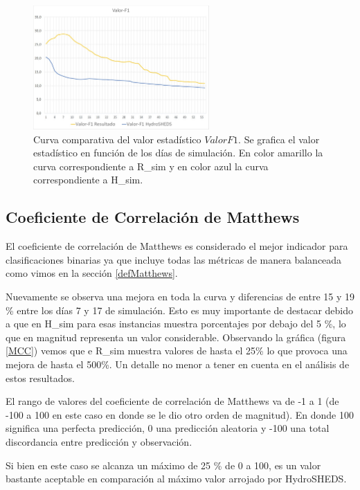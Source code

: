 \documentclass[10pt,a4paper, twoside]{report}
\begin{document}
\begin{figure}[H]
   \centering      
   \includegraphics[width=0.6\textwidth]{imagenes/F1Score.jpg}
 \caption{Curva comparativa del valor estadístico $Valor F1$. Se grafica el valor estadístico en función de los días de simulación. En color amarillo la curva correspondiente a R\_sim y en color azul la curva correspondiente a H\_sim.}
 \label{F1Score}
\end{figure}


\subsection{Coeficiente de Correlación de Matthews}

El coeficiente de correlación de Matthews es considerado el mejor indicador para clasificaciones binarias ya que incluye todas las métricas de manera balanceada como vimos en la sección \ref{defMatthews}.

Nuevamente se observa una mejora en toda la curva y diferencias de entre 15 y 19 \% entre los días 7 y 17 de simulación. Esto es muy importante de destacar debido a que en H\_sim para esas instancias muestra porcentajes por debajo del 5 \%, lo que en magnitud representa un valor considerable. Observando la gráfica (figura \ref{MCC}) vemos que e R\_sim muestra valores de hasta el 25\% lo que provoca una mejora de hasta el 500\%. Un detalle no menor a tener en cuenta en el análisis de estos resultados.

El rango de valores del coeficiente de correlación de Matthews va de -1 a 1 (de -100 a 100 en este caso en donde se le dio otro orden de magnitud). En donde 100 significa una perfecta predicción, 0 una predicción aleatoria y -100 una total discordancia entre predicción y observación. 

Si bien en este caso se alcanza un máximo de 25 \% de 0 a 100, es un valor bastante aceptable en comparación al máximo valor arrojado por HydroSHEDS.
\end{document}
